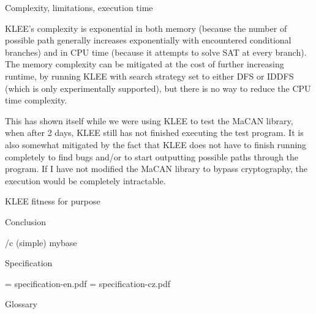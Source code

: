 \sec Complexity, limitations, execution time

KLEE's complexity is exponential in both memory (because the number of possible
path generally increases exponentially with encountered conditional branches)
and in CPU time (because it attempts to solve SAT at every branch). The memory
complexity can be mitigated at the cost of further increasing runtime, by
running KLEE with search strategy set to either DFS or IDDFS (which is only
experimentally supported), but there is no way to reduce the CPU time
complexity.

This has shown itself while we were using KLEE to test the MaCAN library, when
after 2 days, KLEE still has not finished executing the test program. It is
also somewhat mitigated by the fact that KLEE does not have to finish running
completely to find bugs and/or to start outputting possible paths through the
program. If I have not modified the MaCAN library to bypass cryptography, the
execution would be completely intractable.

\sec KLEE fitness for purpose




\chap Conclusion



\bibchap
\usebib/c (simple) mybase


\app Specification

\picw=\hsize
\cinspic specification-en.pdf
\vfil\break
\picw=\hsize
\cinspic specification-cz.pdf
\nextoddpage


\app Glossary\par
\makeglos

\nextoddpage

\bye

